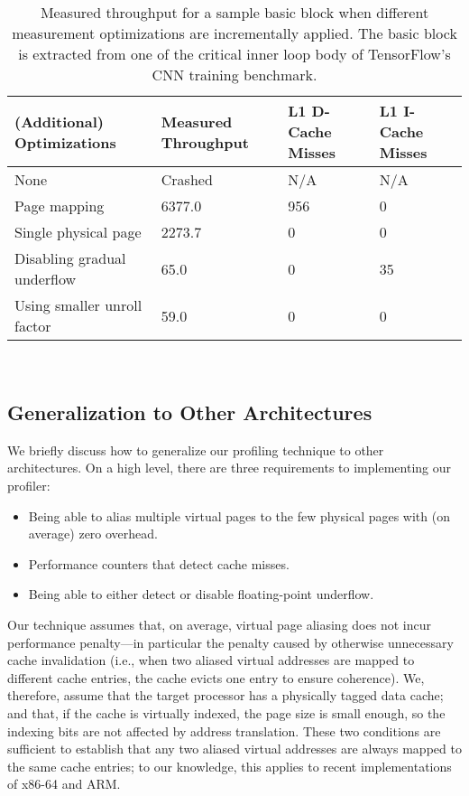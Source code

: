 \begin{table}
\begin{tabular}{
|p{}|p{}|p{}|p{}|}
\hline \textbf{(Additional) Optimizations} &
\textbf{Measured Throughput} &
\textbf{L1 D-Cache Misses} &
\textbf{L1 I-Cache Misses} \\

\hline
None & Crashed & N/A & N/A \\

\hline
Page mapping & 6377.0 & 956 & 0 \\

\hline
Single physical page & 2273.7 & 0 & 0 \\

\hline
Disabling gradual underflow & 65.0 & 0 & 35 \\

\hline
Using smaller unroll factor & 59.0 & 0 & 0\\

\hline
\end{tabular}
\\
\caption{Measured throughput for a sample basic block when
different measurement optimizations are incrementally applied.
The basic block is extracted from one of the critical 
inner loop body of TensorFlow\cite{tensorflow}'s CNN training benchmark.}
\label{tab:ablation}
\end{table}

\subsection{Generalization to Other Architectures}\label{sec:generalization}
We briefly discuss how to generalize our profiling technique to other architectures.
On a high level, there are three requirements to implementing our profiler:
\begin{itemize}
    \item Being able to alias multiple virtual pages to the few physical pages with 
    (on average) zero overhead.
    
    \item Performance counters that detect cache misses.
    
    \item Being able to either detect or disable floating-point underflow.
\end{itemize}
Our technique assumes that, on average, virtual page aliasing does not incur performance penalty---in particular the penalty 
caused by otherwise unnecessary cache invalidation 
(i.e., when two aliased virtual addresses are mapped to different cache entries,
the cache evicts one entry to ensure coherence).
We, therefore, assume that the target processor has a physically tagged 
data cache;
and that, if the cache is virtually indexed,
the page size is small enough, so the indexing bits are not affected by address translation.
These two conditions are sufficient to establish that any two aliased virtual addresses
are always mapped to the same cache entries;
to our knowledge, this applies to recent implementations of x86-64 and ARM.

